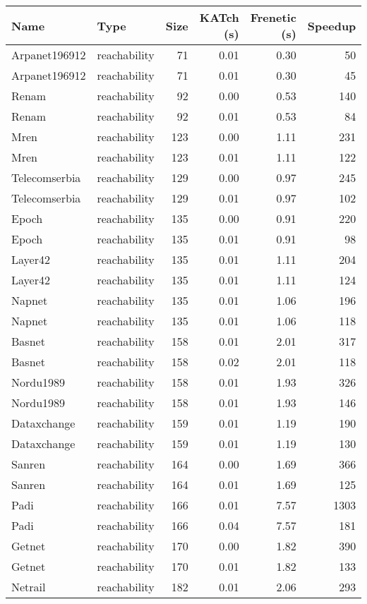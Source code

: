\begin{tabular}{llrrrr}
\toprule
Name & Type & Size & KATch (s) & Frenetic (s) & Speedup \\
\midrule
Arpanet196912 & reachability & 71 & 0.01 & 0.30 & 50 \\
Arpanet196912 & reachability & 71 & 0.01 & 0.30 & 45 \\
Renam & reachability & 92 & 0.00 & 0.53 & 140 \\
Renam & reachability & 92 & 0.01 & 0.53 & 84 \\
Mren & reachability & 123 & 0.00 & 1.11 & 231 \\
Mren & reachability & 123 & 0.01 & 1.11 & 122 \\
Telecomserbia & reachability & 129 & 0.00 & 0.97 & 245 \\
Telecomserbia & reachability & 129 & 0.01 & 0.97 & 102 \\
Epoch & reachability & 135 & 0.00 & 0.91 & 220 \\
Epoch & reachability & 135 & 0.01 & 0.91 & 98 \\
Layer42 & reachability & 135 & 0.01 & 1.11 & 204 \\
Layer42 & reachability & 135 & 0.01 & 1.11 & 124 \\
Napnet & reachability & 135 & 0.01 & 1.06 & 196 \\
Napnet & reachability & 135 & 0.01 & 1.06 & 118 \\
Basnet & reachability & 158 & 0.01 & 2.01 & 317 \\
Basnet & reachability & 158 & 0.02 & 2.01 & 118 \\
Nordu1989 & reachability & 158 & 0.01 & 1.93 & 326 \\
Nordu1989 & reachability & 158 & 0.01 & 1.93 & 146 \\
Dataxchange & reachability & 159 & 0.01 & 1.19 & 190 \\
Dataxchange & reachability & 159 & 0.01 & 1.19 & 130 \\
Sanren & reachability & 164 & 0.00 & 1.69 & 366 \\
Sanren & reachability & 164 & 0.01 & 1.69 & 125 \\
Padi & reachability & 166 & 0.01 & 7.57 & 1303 \\
Padi & reachability & 166 & 0.04 & 7.57 & 181 \\
Getnet & reachability & 170 & 0.00 & 1.82 & 390 \\
Getnet & reachability & 170 & 0.01 & 1.82 & 133 \\
Netrail & reachability & 182 & 0.01 & 2.06 & 293 \\

\end{tabular}
